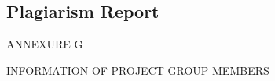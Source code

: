 \documentclass[12pt,a4paper]
{article}
\numberwithin{table}{section}
\begin{document}
{{{{{{{{{\begin{appendices}
\newpage
\section{Plagiarism Report}


\newpage
\begin{minipage}{15cm}
\vspace{4 in}
 \begin{center} 
\begin{Huge}

ANNEXURE G

\vspace{0.5 in}
INFORMATION OF PROJECT GROUP
MEMBERS
\end{Huge}
\end{center}
\end{minipage}


\end{appendices}}}}}}}}}}
\end{document}
